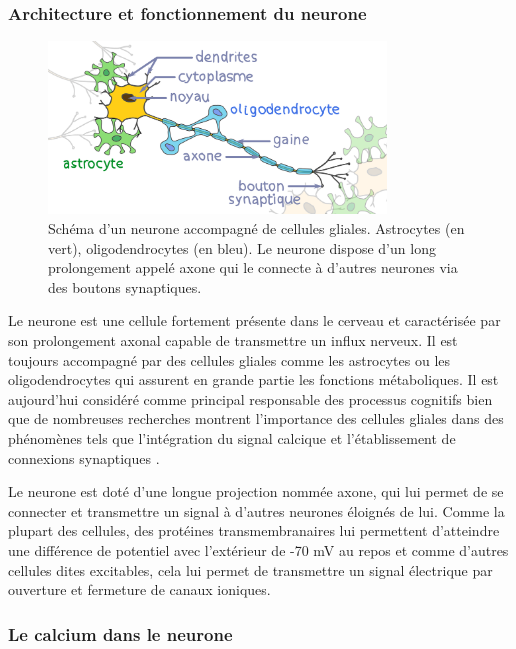 \subsubsection{Architecture et fonctionnement du neurone}

\begin{figure}
  \centering
  \includegraphics[width=0.8\textwidth]{./files/neurone.svg.png}
  \caption{Schéma d'un neurone accompagné de cellules gliales. Astrocytes (en vert), oligodendrocytes (en bleu). Le neurone dispose d'un long prolongement appelé axone qui le connecte à d'autres neurones via des boutons synaptiques.}
  \end{figure}

Le neurone est une cellule fortement présente dans le cerveau et caractérisée par son prolongement axonal capable de transmettre un influx nerveux. Il est toujours accompagné par des cellules gliales comme les astrocytes ou les oligodendrocytes qui assurent en grande partie les fonctions métaboliques. Il est aujourd'hui considéré comme principal responsable des processus cognitifs bien que de nombreuses recherches montrent l'importance des cellules gliales dans des phénomènes tels que l'intégration du signal calcique et l'établissement de connexions synaptiques \cite{verkhratsky_calcium_1996} \cite{pfrieger_synaptic_1997}.

Le neurone est doté d'une longue projection nommée axone, qui lui permet de se connecter et transmettre un signal à d'autres neurones éloignés de lui. Comme la plupart des cellules, des protéines transmembranaires lui permettent d'atteindre une différence de potentiel avec l'extérieur de -70 mV au repos et comme d'autres cellules dites excitables, cela lui permet de transmettre un signal électrique par ouverture et fermeture de canaux ioniques.

\subsubsection{Le calcium dans le neurone}

